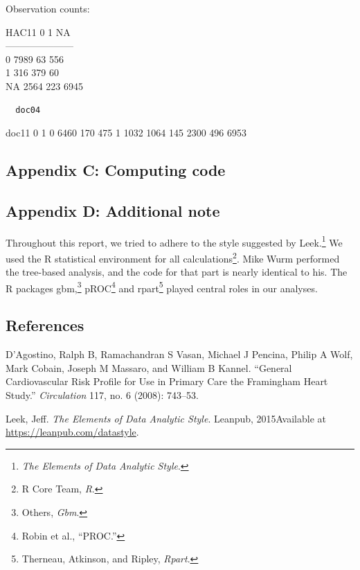 \documentclass[11pt,]{article}
\let\rmarkdownfootnote\footnote%
\def\footnote{\protect\rmarkdownfootnote}
\begin{document}
Observation counts:

HAC11\textbar{} 0 \textbar{} 1 \textbar{}
NA\\-----\textbar{}------\textbar{}-----\textbar{}------\\0 \textbar{}
7989 \textbar{} 63 \textbar{} 556\\ 1 \textbar{} 316 \textbar{} 379
\textbar{} 60\\ NA \textbar{} 2564 \textbar{} 223 \textbar{} 6945

\begin{verbatim}
  doc04
\end{verbatim}

doc11 0 1 0 6460 170 475 1 1032 1064 145 2300 496 6953

\newpage

\subsection{Appendix C: Computing code}\label{appendix-c-computing-code}

\newpage

\subsection{Appendix D: Additional
note}\label{appendix-d-additional-note}

Throughout this report, we tried to adhere to the style suggested by
Leek.\footnote{\emph{The Elements of Data Analytic Style}.} We used the
R statistical environment for all calculations\footnote{R Core Team,
  \emph{R}. }. Mike Wurm performed the tree-based analysis, and the code
for that part is nearly identical to his. The R packages gbm,\footnote{Others,
  \emph{Gbm}. } pROC\footnote{Robin et al., ``PROC.'' } and
rpart\footnote{Therneau, Atkinson, and Ripley, \emph{Rpart}. } played
central roles in our analyses.

\subsection*{References}\label{references}

D'Agostino, Ralph B, Ramachandran S Vasan, Michael J Pencina, Philip A
Wolf, Mark Cobain, Joseph M Massaro, and William B Kannel. ``General
Cardiovascular Risk Profile for Use in Primary Care the Framingham Heart
Study.'' \emph{Circulation} 117, no. 6 (2008): 743--53.

Leek, Jeff. \emph{The Elements of Data Analytic Style}. Leanpub,
2015Available at \url{https://leanpub.com/datastyle}.
\end{document}
